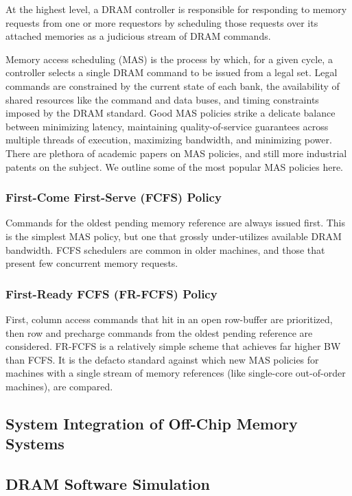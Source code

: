 At the highest level, a DRAM controller is responsible for responding to memory
requests from one or more requestors by scheduling those requests over its
attached memories as a judicious stream of DRAM commands.

Memory access scheduling (MAS) is the process by which, for a given cycle, a
controller selects a single DRAM command to be issued from a legal set. Legal
commands are constrained by the current state of each bank, the availability
of shared resources like the command and data buses, and timing constraints
imposed by the DRAM standard. Good MAS policies strike a delicate balance
between minimizing latency, maintaining quality-of-service guarantees across
multiple threads of execution, maximizing bandwidth, and minimizing power.
There are plethora of academic papers on MAS policies, and still more
industrial patents on the subject. We outline some of the most popular MAS policies
here.

\subsubsection{First-Come First-Serve (FCFS) Policy}\label{fcfs}
Commands for the oldest pending memory reference are always issued first. This
is the simplest MAS policy, but one that grossly under-utilizes available DRAM
bandwidth. FCFS schedulers are common in older machines, and those that present
few concurrent memory requests.

\subsubsection{First-Ready FCFS (FR-FCFS)\cite{frfcfs} Policy}\label{frfcfs}
First, column access commands that hit in an open row-buffer are prioritized,
then row and precharge commands from the oldest pending reference are
considered.  FR-FCFS is a relatively simple scheme that achieves far higher BW
than FCFS. It is the defacto standard against which new MAS policies for
machines with a single stream of memory references (like single-core
out-of-order machines), are compared.


\subsection{System Integration of Off-Chip Memory Systems}


\subsection{DRAM Software Simulation}


